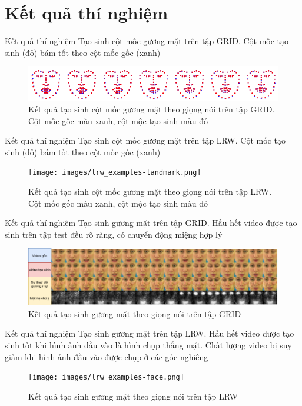 \section{Kết quả thí nghiệm}\label{sec:result}
\frame{\tableofcontents[currentsection]}

\begin{frame}{Kết quả thí nghiệm}
Tạo sinh cột mốc gương mặt trên tập GRID. Cột mốc tạo sinh (đỏ) bám tốt theo cột mốc gốc (xanh)
\begin{figure}[H]
    \centering
    \includegraphics[width=15cm]{images/grid_examples-landmark.png}
    \caption{Kết quả tạo sinh cột mốc gương mặt theo giọng nói trên tập GRID. Cột mốc gốc màu xanh, cột mộc tạo sinh màu đỏ}
\end{figure}
\end{frame}

\begin{frame}{Kết quả thí nghiệm}
Tạo sinh cột mốc gương mặt trên tập LRW. Cột mốc tạo sinh (đỏ) bám tốt theo cột mốc gốc (xanh)
\begin{figure}[H]
    \centering
    \texttt{[image: images/lrw\_examples-landmark.png]}
    \caption{Kết quả tạo sinh cột mốc gương mặt theo giọng nói trên tập LRW. Cột mốc gốc màu xanh, cột mộc tạo sinh màu đỏ}
\end{figure}
\end{frame}

\begin{frame}{Kết quả thí nghiệm}
Tạo sinh gương mặt trên tập GRID. Hầu hết video được tạo sinh trên tập test đều rõ ràng, có chuyển động miệng hợp lý
\begin{figure}[H]
    \centering
    \includegraphics[width=15cm]{images/grid_examples-face.png}
    \caption{Kết quả tạo sinh gương mặt theo giọng nói trên tập GRID}
\end{figure}
\end{frame}

\begin{frame}{Kết quả thí nghiệm}
Tạo sinh gương mặt trên tập LRW. Hầu hết video được tạo sinh tốt khi hình ảnh đầu vào là hình chụp thẳng mặt. Chất lượng video bị suy giảm khi hình ảnh đầu vào được chụp ở các góc nghiêng
\begin{figure}[H]
    \centering
    \texttt{[image: images/lrw\_examples-face.png]}
    \caption{Kết quả tạo sinh gương mặt theo giọng nói trên tập LRW}
\end{figure}
\end{frame}


